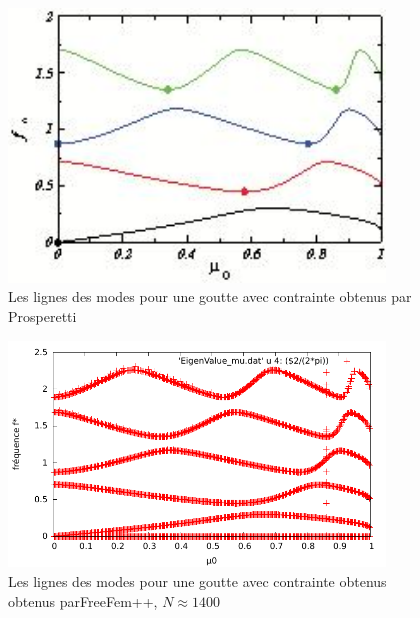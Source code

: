 \documentclass[a4paper]{report}
\begin{document}
\begin{figure}[!htbp]
\centering
\includegraphics[width=10cm]{2_3_2_contrainte_Prosperetti.jpeg}
\caption{Les lignes des modes pour une goutte avec contrainte obtenus par Prosperetti}
\end{figure}
\begin{figure}[!htbp]
\centering
\includegraphics[width=10cm]{2_3_2_contrainte_FreeFem}
\caption{Les lignes des modes pour une goutte avec contrainte obtenus obtenus parFreeFem++, $N \approx 1400$}
\end{figure}
\end{document}

